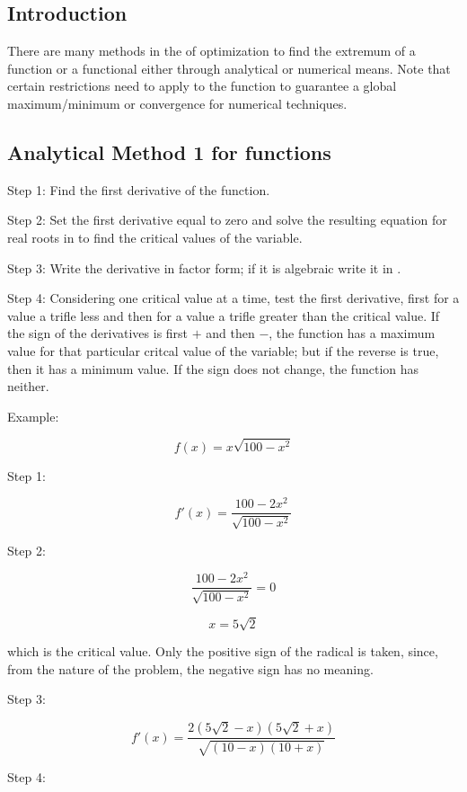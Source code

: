 \documentclass[12pt]{article}
\begin{document}
\subsection{Introduction}

There are many methods in the  of optimization to find the extremum of a function or a functional either through analytical or numerical means.  Note that certain restrictions need to apply to the function to guarantee a global maximum/minimum or convergence for numerical techniques.

\subsection{Analytical Method 1 for functions}

Step 1:  Find the first derivative of the function.

Step 2: Set the first derivative equal to zero and solve the resulting equation for real roots in  to find the critical values of the variable.

Step 3:  Write the derivative in factor form; if it is algebraic write it in .

Step 4:  Considering one critical value at a time, test the first derivative, first for a value a trifle less and then for a value a trifle greater than the critical value.  If the sign of the derivatives  is first $+$ and then $-$,  the function has a maximum value for that particular critcal value of the variable; but if the reverse is true, then it has a minimum value.  If the sign does not change, the function has neither.

Example:

$$ f(x) = x \sqrt{100 - x^2} $$

Step 1:

$$ f'(x) = \frac{100 - 2x^2}{\sqrt{100 - x^2}} $$

Step 2:

$$ \frac{100 - 2x^2}{\sqrt{100 - x^2}} = 0 $$

$$ x = 5 \sqrt{2} $$

which is the critical value.  Only the positive sign of the radical is taken, since, from the nature of the problem, the negative sign has no meaning.

Step 3:

$$ f'(x) = \frac{2(5\sqrt{2} - x)(5\sqrt{2} + x)}{\sqrt{(10 - x)(10 + x)}} $$

Step 4:  
\end{document}
